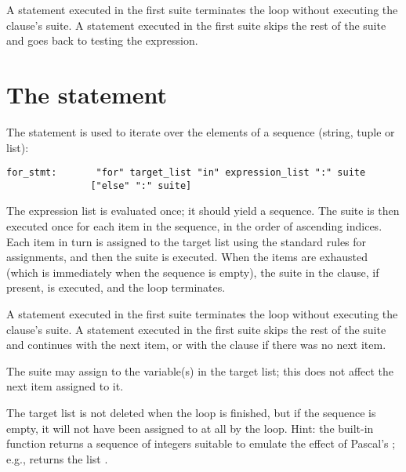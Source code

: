 A  statement executed in the first suite terminates the
loop without executing the  clause's suite.  A
 statement executed in the first suite skips the rest
of the suite and goes back to testing the expression.

\section{The  statement\label{for}}

The  statement is used to iterate over the elements of a
sequence (string, tuple or list):

\begin{verbatim}
for_stmt:       "for" target_list "in" expression_list ":" suite
               ["else" ":" suite]
\end{verbatim}

The expression list is evaluated once; it should yield a sequence.  The
suite is then executed once for each item in the sequence, in the
order of ascending indices.  Each item in turn is assigned to the
target list using the standard rules for assignments, and then the
suite is executed.  When the items are exhausted (which is immediately
when the sequence is empty), the suite in the  clause, if
present, is executed, and the loop terminates.

A  statement executed in the first suite terminates the
loop without executing the  clause's suite.  A
 statement executed in the first suite skips the rest
of the suite and continues with the next item, or with the 
clause if there was no next item.

The suite may assign to the variable(s) in the target list; this does
not affect the next item assigned to it.

The target list is not deleted when the loop is finished, but if the
sequence is empty, it will not have been assigned to at all by the
loop.  Hint: the built-in function  returns a
sequence of integers suitable to emulate the effect of Pascal's
;
e.g.,  returns the list \code{[0, 1, 2]}.

